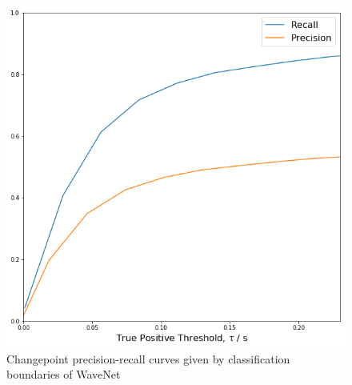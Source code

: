 \documentclass{article}[12pt]
\numberwithin{equation}{section}
\begin{document}
\begin{figure}[H]
\centering{}
\captionsetup{justification=centering}
\includegraphics[scale=0.5]{overfit}
\caption{
Changepoint precision-recall curves given by classification boundaries of WaveNet
}
\label{fig:overfit}
\end{figure}



\end{document}
